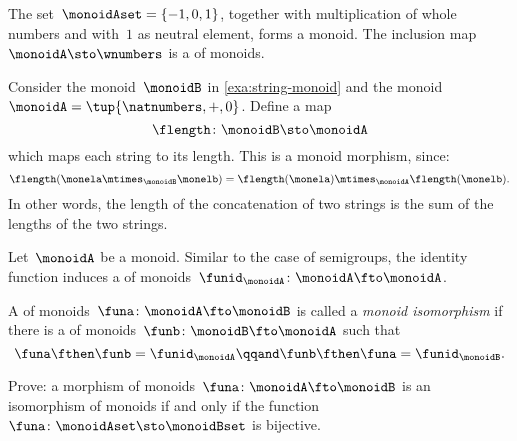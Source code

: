 \begin{example}
  The set~$\monoidAset = \{ -1, 0, 1 \}$, together with multiplication of whole numbers and with~$1$ as neutral element, forms a monoid.
  The inclusion map~$\monoidA \sto \wnumbers$ is a \whomo of monoids.
\end{example}

\begin{example}
  \label{exa:string-length}
  Consider the monoid~$\monoidB$ in \cref{exa:string-monoid} and the monoid~$\monoidA=\tup{\natnumbers, +,0}$.
  Define a map
  \begin{equation*}
    \flength \colon \monoidB \sto \monoidA
\end{equation*}
  which maps each string to its length. This is a monoid morphism, since:
\begin{equation*}
  \flength(\monela \mtimes_\monoidB \monelb)=\flength(\monela)\mtimes_\monoidA \flength(\monelb).
\end{equation*}
  In other words, the length of the concatenation of two strings is the sum of the lengths of the two strings.
\end{example}



\begin{definition}
  \label{def:identity-mon-mor}
  Let~$\monoidA$ be a monoid. Similar to the case of semigroups, the identity function induces a \whomo of monoids~$\funid_\monoidA\colon \monoidA \fto \monoidA$.
\end{definition}



\begin{definition}
  \label{def:monoid-iso}
  A \whomo of monoids~$\funa\colon \monoidA \fto \monoidB$ is called a \emph{monoid isomorphism} if there is a \whomo of monoids~$\funb\colon \monoidB \fto \monoidA$ such that
  \begin{equation}
    \funa \fthen \funb = \funid_\monoidA \qqand \funb \fthen \funa = \funid_\monoidB.
  \end{equation}
\end{definition}


\begin{gradedexercise}
  Prove: a morphism of monoids~$\funa\colon \monoidA \fto \monoidB$ is an isomorphism of monoids if and only if the function~$\funa\colon \monoidAset \sto \monoidBset$ is bijective.
\end{gradedexercise}



